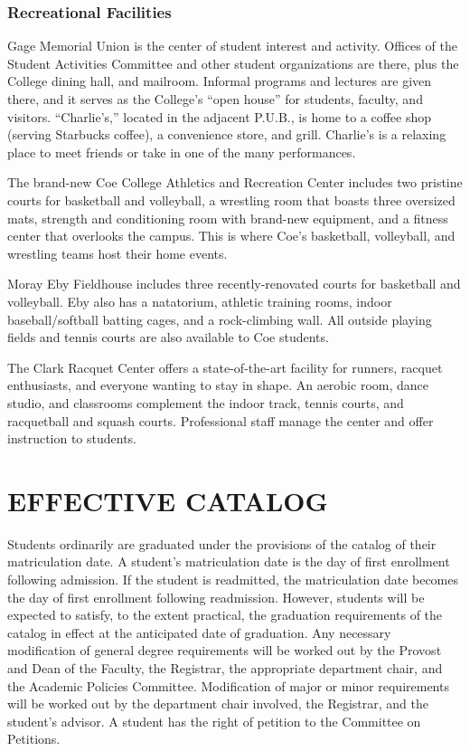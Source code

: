 \documentclass[
  letterpaper,
]{scrbook}
\renewcommand{\part}[1]{\addcontentsline{toc}{part}{#1}}
\begin{document}
\subsection{Recreational Facilities}\label{recreational-facilities}

Gage Memorial Union is the center of student interest and activity.
Offices of the Student Activities Committee and other student
organizations are there, plus the College dining hall, and mailroom.
Informal programs and lectures are given there, and it serves as the
College's ``open house'' for students, faculty, and visitors.
``Charlie's,'' located in the adjacent P.U.B., is home to a coffee shop
(serving Starbucks coffee), a convenience store, and grill. Charlie's is
a relaxing place to meet friends or take in one of the many
performances.

The brand-new Coe College Athletics and Recreation Center includes two
pristine courts for basketball and volleyball, a wrestling room that
boasts three oversized mats, strength and conditioning room with
brand-new equipment, and a fitness center that overlooks the campus.
This is where Coe's basketball, volleyball, and wrestling teams host
their home events.

Moray Eby Fieldhouse includes three recently-renovated courts for
basketball and volleyball. Eby also has a natatorium, athletic training
rooms, indoor baseball/softball batting cages, and a rock-climbing wall.
All outside playing fields and tennis courts are also available to Coe
students.

The Clark Racquet Center offers a state-of-the-art facility for runners,
racquet enthusiasts, and everyone wanting to stay in shape. An aerobic
room, dance studio, and classrooms complement the indoor track, tennis
courts, and racquetball and squash courts. Professional staff manage the
center and offer instruction to students.

\part{COLLEGE REGULATIONS}

\chapter{EFFECTIVE CATALOG}\label{effective-catalog}

Students ordinarily are graduated under the provisions of the catalog of
their matriculation date. A student's matriculation date is the day of
first enrollment following admission. If the student is readmitted, the
matriculation date becomes the day of first enrollment following
readmission. However, students will be expected to satisfy, to the
extent practical, the graduation requirements of the catalog in effect
at the anticipated date of graduation. Any necessary modification of
general degree requirements will be worked out by the Provost and Dean
of the Faculty, the Registrar, the appropriate department chair, and the
Academic Policies Committee. Modification of major or minor requirements
will be worked out by the department chair involved, the Registrar, and
the student's advisor. A student has the right of petition to the
Committee on Petitions.
\end{document}
